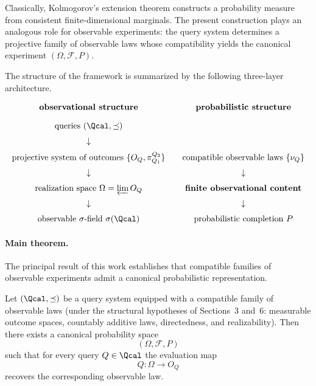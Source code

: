 Classically, Kolmogorov's extension theorem constructs a probability
measure from consistent finite-dimensional marginals.  The present
construction plays an analogous role for observable experiments: the
query system determines a projective family of observable laws whose
compatibility yields the canonical experiment $(\Omega,\mathcal F,P)$.

The structure of the framework is summarized by the following
three-layer architecture.

\begin{center}
\[
\begin{array}{ccc}
\textbf{observational structure} & & \textbf{probabilistic structure} \\[10pt]

\text{queries } (\Qcal,\preceq)
& & \\[6pt]

\downarrow
& & \\[6pt]

\text{projective system of outcomes } \{O_Q,\pi^{Q_2}_{Q_1}\}
& & \text{compatible observable laws } \{\nu_Q\} \\[6pt]

\downarrow
& & \downarrow \\[6pt]

\text{realization space }
\Omega=\varprojlim O_Q
& & \textbf{finite observational content} \\[6pt]

\downarrow
& & \downarrow \\[6pt]

\text{observable }\sigma\text{-field } \sigma(\Qcal)
& & \text{probabilistic completion } P
\end{array}
\]
\end{center}

\paragraph{Main theorem.}
The principal result of this work establishes that compatible families
of observable experiments admit a canonical probabilistic
representation.

\begin{theorem}
Let $(\Qcal,\preceq)$ be a query system equipped with a compatible
family of observable laws (under the structural hypotheses of
Sections~3 and~6: measurable outcome spaces, countably additive
laws, directedness, and realizability).  Then there exists a
canonical probability space
\[
(\Omega,\mathcal F,P)
\]
such that for every query $Q\in\Qcal$ the evaluation map
\[
Q:\Omega\to O_Q
\]
recovers the corresponding observable law.
\end{theorem}

